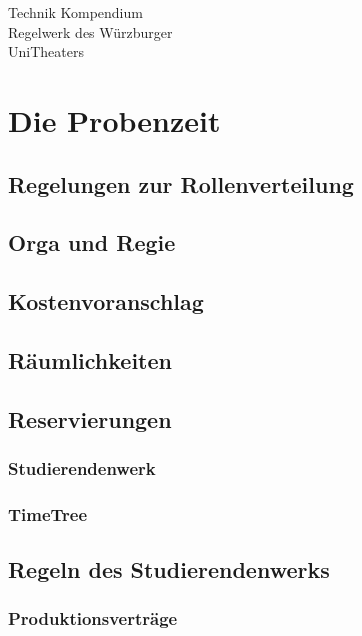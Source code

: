 \documentclass[a4paper]{article}
\begin{document}
\begin{small}
	\noindent
	
\end{small}
\bigskip

\begin{center}
	\LARGE Technik Kompendium \\
	\large Regelwerk des Würzburger\\ UniTheaters
\end{center}
\smallskip

\tableofcontents



\newpage



\newpage

\section{Die Probenzeit}
\subsection{Regelungen zur Rollenverteilung}
\subsection{Orga und Regie}
\subsection{Kostenvoranschlag}
\subsection{Räumlichkeiten}
\subsection{Reservierungen}
\subsubsection{Studierendenwerk}
\subsubsection{TimeTree}
\subsection{Regeln des Studierendenwerks}
\subsubsection{Produktionsverträge}
\end{document}
